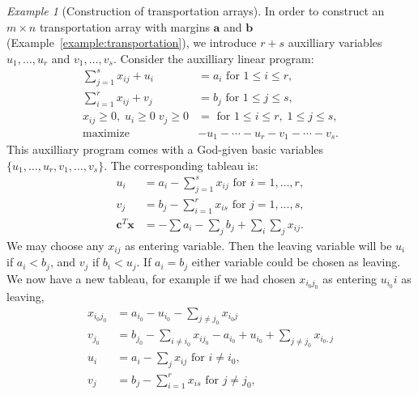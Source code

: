 \documentclass{amsbook}
\newcommand{\xx}{\mathbf x}
\newcommand{\cc}{\mathbf c}
\newcommand{\bb}{\mathbf b}
\renewcommand{\aa}{\mathbf a}
\theoremstyle{definition}
\theoremstyle{remark}
\newtheorem{example}[theorem]{Example}
\begin{document}
\begin{example}
  [Construction of transportation arrays]
  \label{example:transportation-vertex-algo}
  In order to construct an $m\times n$ transportation array with margins $\aa$ and $\bb$ (Example~\ref{example:transportation}), we introduce $r+s$ auxilliary variables $u_1,\dotsc,u_r$ and $v_1,\dotsc,v_s$.
  Consider the auxilliary linear program:
  \begin{equation}
    \label{eq:transportation}
    \begin{matrix}
      \sum_{j=1}^s x_{ij} + u_i & = a_i \text{ for } 1\leq i\leq r,\\
      \sum_{i=1}^r x_{ij} + v_j & = b_j \text{ for } 1\leq j\leq s,\\
      x_{ij}\geq 0,\;u_i\geq 0\;v_j\geq 0 &= \text{ for } 1\leq i\leq r,\;1\leq j\leq s,\\
      \hline
      \text{maximize} & -u_1-\dotsb -u_r - v_1 - \dotsb -v_s.
    \end{matrix}
  \end{equation}
  This auxilliary program comes with a God-given basic variables $\{u_1,\dotsc,u_r,v_1,\dotsc,v_s\}$.
  The corresponding tableau is:
  \begin{displaymath}
    \begin{matrix}
      u_i & = a_i - \sum_{j=1}^s x_{ij} \text{ for } i=1,\dotsc,r,\\
      v_j & = b_j - \sum_{i=1}^r x_{is} \text{ for } j=1,\dotsc,s,\\
      \hline
      \cc^T\xx &= -\sum a_i - \sum_j b_j + \sum_i\sum_j x_{ij}. 
    \end{matrix}
  \end{displaymath}
  We may choose any $x_{ij}$ as entering variable.
  Then the leaving variable will be $u_i$ if $a_i<b_j$, and $v_j$ if $b_i<u_j$.
  If $a_i=b_j$ either variable could be chosen as leaving.
  We now have a new tableau, for example if we had chosen $x_{i_0j_0}$ as entering $u_{i_0}i$ as leaving,
  \begin{displaymath}
    \begin{matrix}
      x_{i_0j_0} & = a_{i_0} - u_{i_0} -\sum_{j\neq j_0} x_{i_0j}\\
      v_{j_0} & = b_{j_0} - \sum_{i\neq i_0} x_{ij_0} - a_{i_0} + u_{i_0} + \sum_{j\neq j_0} x_{i_0,j}\\
      u_i & = a_i - \sum_j x_{ij} \text{ for }i\neq i_0,\\
      v_j & = b_j - \sum_{i=1}^r x_{is} \text{ for } j\neq j_0,\\

\end{matrix}
\end{displaymath}
\end{example}
\end{document}
